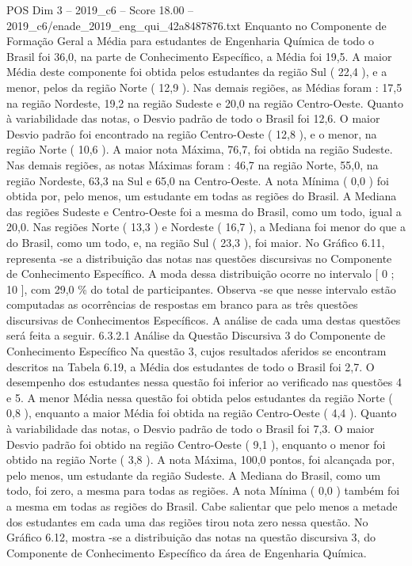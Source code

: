 \begin{textsample}{POS Dim 3 – 2019\_c6 – Score 18.00 – 2019\_c6/enade\_2019\_eng\_qui\_42a8487876.txt}
Enquanto no Componente de Formação Geral a Média para estudantes de Engenharia Química de todo o Brasil foi 36,0, na parte de Conhecimento Específico, a Média foi 19,5.
A maior Média deste componente foi obtida pelos estudantes da região Sul ( 22,4 ), e a menor, pelos da região Norte ( 12,9 ).
Nas demais regiões, as Médias foram : 17,5 na região Nordeste, 19,2 na região Sudeste e 20,0 na região Centro-Oeste.
Quanto à variabilidade das notas, o Desvio padrão de todo o Brasil foi 12,6.
O maior Desvio padrão foi encontrado na região Centro-Oeste ( 12,8 ), e o menor, na região Norte ( 10,6 ).
A maior nota Máxima, 76,7, foi obtida na região Sudeste.
Nas demais regiões, as notas Máximas foram : 46,7 na região Norte, 55,0, na região Nordeste, 63,3 na Sul e 65,0 na Centro-Oeste.
A nota Mínima ( 0,0 ) foi obtida por, pelo menos, um estudante em todas as regiões do Brasil.
A Mediana das regiões Sudeste e Centro-Oeste foi a mesma do Brasil, como um todo, igual a 20,0.
Nas regiões Norte ( 13,3 ) e Nordeste ( 16,7 ), a Mediana foi menor do que a do Brasil, como um todo, e, na região Sul ( 23,3 ), foi maior.
No Gráfico 6.11, representa -se a distribuição das notas nas questões discursivas no Componente de Conhecimento Específico.
A moda dessa distribuição ocorre no intervalo [ 0 ; 10 ], com 29,0 \% do total de participantes.
Observa -se que nesse intervalo estão computadas as ocorrências de respostas em branco para as três questões discursivas de Conhecimentos Específicos.
A análise de cada uma destas questões será feita a seguir. 6.3.2.1 Análise da Questão Discursiva 3 do Componente de Conhecimento Específico Na questão 3, cujos resultados aferidos se encontram descritos na Tabela 6.19, a Média dos estudantes de todo o Brasil foi 2,7.
O desempenho dos estudantes nessa questão foi inferior ao verificado nas questões 4 e 5.
A menor Média nessa questão foi obtida pelos estudantes da região Norte ( 0,8 ), enquanto a maior Média foi obtida na região Centro-Oeste ( 4,4 ).
Quanto à variabilidade das notas, o Desvio padrão de todo o Brasil foi 7,3.
O maior Desvio padrão foi obtido na região Centro-Oeste ( 9,1 ), enquanto o menor foi obtido na região Norte ( 3,8 ).
A nota Máxima, 100,0 pontos, foi alcançada por, pelo menos, um estudante da região Sudeste.
A Mediana do Brasil, como um todo, foi zero, a mesma para todas as regiões.
A nota Mínima ( 0,0 ) também foi a mesma em todas as regiões do Brasil.
Cabe salientar que pelo menos a metade dos estudantes em cada uma das regiões tirou nota zero nessa questão.
No Gráfico 6.12, mostra -se a distribuição das notas na questão discursiva 3, do Componente de Conhecimento Específico da área de Engenharia Química.

\end{textsample}
